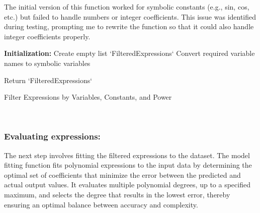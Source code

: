 \documentclass{article}
\begin{document}
The initial version of this function worked for symbolic constants (e.g., sin, cos, etc.) but failed to handle numbers or integer coefficients. This issue was identified during testing, prompting me to rewrite the function so that it could also handle integer coefficients properly.\\



\begin{algorithm}[H]
\SetAlgoLined
{}

\textbf{Initialization:}\;
Create empty list `FilteredExpressions`\;
Convert required variable names to symbolic variables\;


Return `FilteredExpressions`\;

\caption{Filter Expressions by Variables, Constants, and Power}
\label{alg:filter_expressions} %
\end{algorithm}\\





\subsubsection{Evaluating expressions:}

The next step involves fitting the filtered expressions to the dataset. The model fitting function fits polynomial expressions to the input data by determining the optimal set of coefficients that minimize the error between the predicted and actual output values. It evaluates multiple polynomial degrees, up to a specified maximum, and selects the degree that results in the lowest error, thereby ensuring an optimal balance between accuracy and complexity.\\
\end{document}
